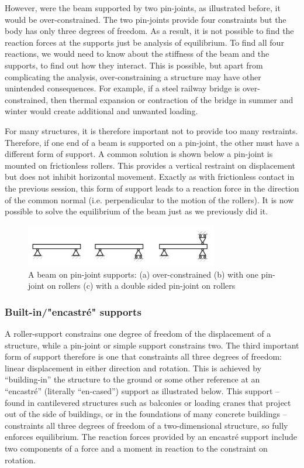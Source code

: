 \documentclass{article}
\begin{document}
However, were the beam supported by two pin-joints, as illustrated before, it would be over-constrained. The two pin-joints provide four constraints but the body has only three degrees of
freedom. As a result, it is not possible to find the reaction forces at the supports just be analysis of
equilibrium. To find all four reactions, we would need to know about the stiffness of the beam
and the supports, to find out how they interact. This is possible, but apart from complicating the
analysis, over-constraining a structure may have other unintended consequences. For example, if
a steel railway bridge is over-constrained, then thermal expansion or contraction of the bridge in
summer and winter would create additional and unwanted loading. 

For many structures, it is therefore important not to provide too many restraints. Therefore, if one
end of a beam is supported on a pin-joint, the other must have a different form of support. A
common solution is shown below a pin-joint is mounted on frictionless rollers. This
provides a vertical restraint on displacement but does not inhibit horizontal movement. Exactly
as with frictionless contact in the previous session, this form of support leads to a reaction force
in the direction of the common normal (i.e. perpendicular to the motion of the rollers). It is now
possible to solve the equilibrium of the beam just as we previously did it.

\begin{figure}[h]
    \centering
    \includegraphics[width = 0.75\textwidth]{images/roller.png}
    \caption{\centering A beam on pin-joint supports: (a) over-constrained (b) with one pin-joint on rollers (c) with a double sided pin-joint on rollers}
    \label{fig:enter-label}
\end{figure}

\subsubsection{Built-in/"encastré" supports}

A roller-support constrains one degree of freedom of the displacement of a structure, while a pin-joint or simple support constrains two. The third important form of support therefore is one that
constraints all three degrees of freedom: linear displacement in either direction and rotation. This
is achieved by “building-in” the structure to the ground or some other reference at an “encastré”
(literally “en-cased”) support as illustrated below. This support – found in cantilevered
structures such as balconies or loading cranes that project out of the side of buildings, or in the
foundations of many concrete buildings – constraints all three degrees of freedom of a two-dimensional structure, so fully enforces equilibrium. The reaction forces provided by an encastré
support include two components of a force and a moment in reaction to the constraint on rotation.
\end{document}
